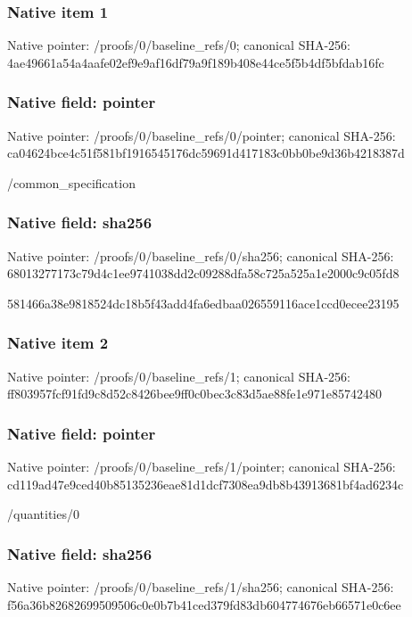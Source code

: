 \documentclass[10pt,a4paper]{article}
\begin{document}
\subsubsection{Native item 1}
Native pointer: /proofs/0/baseline\_\allowbreak{}refs/0; canonical SHA-256: 4ae49661a54a4aafe02ef9e9af16df79a9f189b408e44ce5f5b4df5bfdab16fc

\subsubsection{Native field: pointer}
Native pointer: /proofs/0/baseline\_\allowbreak{}refs/0/pointer; canonical SHA-256: ca04624bce4c51f581bf1916545176dc59691d417183c0bb0be9d36b4218387d

\begingroup\raggedright\sloppy /\allowbreak{}common\_\allowbreak{}specification\par\endgroup

\subsubsection{Native field: sha256}
Native pointer: /proofs/0/baseline\_\allowbreak{}refs/0/sha256; canonical SHA-256: 68013277173c79d4c1ee9741038dd2c09288dfa58c725a525a1e2000c9c05fd8

\begingroup\raggedright\sloppy 581466a38e9818524dc18b5f43add4fa6edbaa026559116ace1ccd0ecee23195\par\endgroup

\subsubsection{Native item 2}
Native pointer: /proofs/0/baseline\_\allowbreak{}refs/1; canonical SHA-256: ff803957fcf91fd9c8d52c8426bee9ff0c0bec3c83d5ae88fe1e971e85742480

\subsubsection{Native field: pointer}
Native pointer: /proofs/0/baseline\_\allowbreak{}refs/1/pointer; canonical SHA-256: cd119ad47e9ced40b85135236eae81d1dcf7308ea9db8b43913681bf4ad6234c

\begingroup\raggedright\sloppy /\allowbreak{}quantities/\allowbreak{}0\par\endgroup

\subsubsection{Native field: sha256}
Native pointer: /proofs/0/baseline\_\allowbreak{}refs/1/sha256; canonical SHA-256: f56a36b82682699509506c0e0b7b41ced379fd83db604774676eb66571e0c6ee
\end{document}
